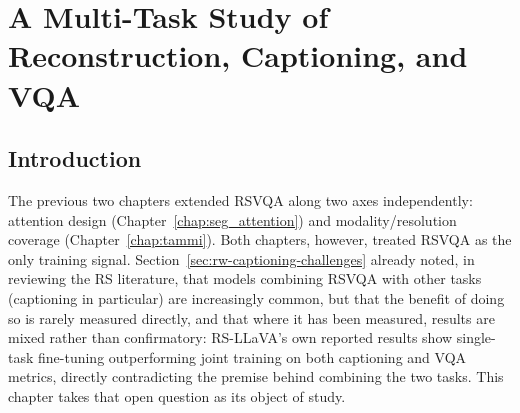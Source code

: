 \titlespacing*{\chapter}{0pt}{-35pt}{40pt}
\chapter{A Multi-Task Study of Reconstruction, Captioning, and VQA}
\label{chap:multitask}
\startcontents[chapters]
\section{Introduction}
\label{sec:chap6_intro}

The previous two chapters extended RSVQA along two axes independently:
attention design (Chapter~\ref{chap:seg_attention}) and modality/resolution
coverage (Chapter~\ref{chap:tammi}). Both chapters, however, treated
RSVQA as the only training signal. Section~\ref{sec:rw-captioning-challenges}
already noted, in reviewing the RS literature, that models
combining RSVQA with other tasks (captioning in particular) are
increasingly common, but that the benefit of doing so is rarely measured
directly, and that where it has been measured, results are mixed rather
than confirmatory: RS-LLaVA's own reported results show single-task
fine-tuning outperforming joint training on both captioning and VQA
metrics, directly contradicting the premise behind combining the two
tasks. This chapter takes that open question as its object of study.

